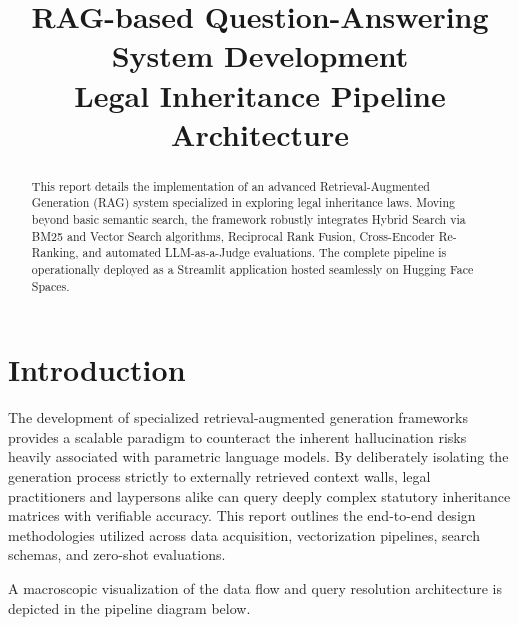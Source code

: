 \documentclass[conference]{IEEEtran}
\title{RAG-based Question-Answering System Development\\ \large{Legal Inheritance Pipeline Architecture}}
\author{
\IEEEauthorblockN{[Name 1]}
\IEEEauthorblockA{\textit{[Student ID 1]}}
\and
\IEEEauthorblockN{[Name 2]}
\IEEEauthorblockA{\textit{[Student ID 2]}}
\and
\IEEEauthorblockN{[Name 3]}
\IEEEauthorblockA{\textit{[Student ID 3]}}
}
\begin{document}
\maketitle

\begin{abstract}
This report details the implementation of an advanced Retrieval-Augmented Generation (RAG) system specialized in exploring legal inheritance laws. Moving beyond basic semantic search, the framework robustly integrates Hybrid Search via BM25 and Vector Search algorithms, Reciprocal Rank Fusion, Cross-Encoder Re-Ranking, and automated LLM-as-a-Judge evaluations. The complete pipeline is operationally deployed as a Streamlit application hosted seamlessly on Hugging Face Spaces.
\end{abstract}

\section{Introduction}
The development of specialized retrieval-augmented generation frameworks provides a scalable paradigm to counteract the inherent hallucination risks heavily associated with parametric language models. By deliberately isolating the generation process strictly to externally retrieved context walls, legal practitioners and laypersons alike can query deeply complex statutory inheritance matrices with verifiable accuracy. This report outlines the end-to-end design methodologies utilized across data acquisition, vectorization pipelines, search schemas, and zero-shot evaluations.

A macroscopic visualization of the data flow and query resolution architecture is depicted in the pipeline diagram below.
\end{document}
